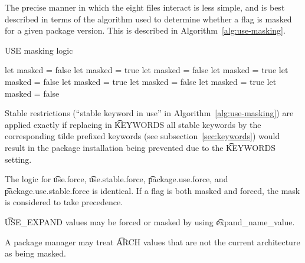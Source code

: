 The precise manner in which the eight files interact is less simple, and is best described in terms
of the algorithm used to determine whether a flag is masked for a given package version. This is
described in Algorithm~\ref{alg:use-masking}.
\begin{algorithm}
\caption{USE masking logic} \label{alg:use-masking}
\begin{algorithmic}[1]
\STATE let masked = false
        \STATE let masked = true
        \STATE let masked = false
    \ENDIF
            \STATE let masked = true
            \STATE let masked = false
        \ENDIF
    \ENDIF
            \STATE let masked = true
            \STATE let masked = false
        \ENDIF
    \ENDFOR
                \STATE let masked = true
                \STATE let masked = false
            \ENDIF
        \ENDFOR
    \ENDIF
\ENDFOR
\end{algorithmic}
\end{algorithm}

Stable restrictions (``stable keyword in use'' in Algorithm~\ref{alg:use-masking}) are applied
exactly if replacing in \t{KEYWORDS} all stable keywords by the corresponding tilde prefixed
keywords (see subsection~\ref{sec:keywords}) would result in the package installation being
prevented due to the \t{KEYWORDS} setting.

The logic for \t{use.force}, \t{use.stable.force}, \t{package.use.force}, and
\t{package.use.\allowbreak stable.force} is identical. If a flag is both masked and forced, the
mask is considered to take precedence.

\t{USE\_EXPAND} values may be forced or masked by using \t{expand\_name\_value}.

A package manager may treat \t{ARCH} values that are not the current architecture as being masked.




